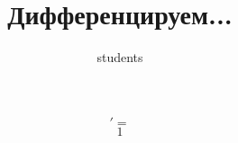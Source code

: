 \documentclass{article}
\title{Дифференцируем...}
\begin{document}
\author{students}
\maketitle
\fontsize{14}{8pt}\selectfont
\begin{equation}
[{x}]' =
\end{equation}
\begin{equation}
{1}
\end{equation}
\end{document}
